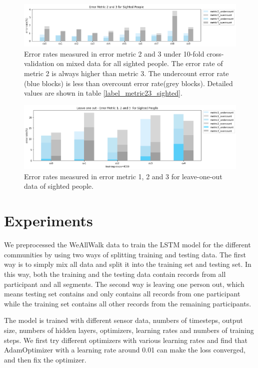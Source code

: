 \documentclass[11pt]{article}
\begin{document}
\begin{figure}[ht]
\centering
\includegraphics[scale=0.5]{error_metric_23_na_10fold}
\caption{Error rates measured in error metric 2 and 3 under 10-fold cross-validation on mixed data for all sighted people. The error rate of metric 2 is always higher than metric 3. The undercount error rate (blue blocks) is less than overcount error rate(grey blocks). Detailed values are shown in table \ref{label_metric23_sighted}.}
\label{fig:error_metric_23_na_10fold}
\end{figure}

\begin{figure}[ht]
\centering
\includegraphics[scale=0.5]{error_metric_123_na_5fold}
\caption{Error rates measured in error metric 1, 2 and 3 for leave-one-out data of sighted people.}
\label{fig:error_metric_123_na_5fold}
\end{figure}


\section{Experiments}

We preprocessed the WeAllWalk data to train the LSTM model for the different communities by using two ways of splitting training and testing data. The first way is to simply mix all data and split it into the training set and testing set. In this way, both the training and the testing data contain records from all participant and all segments. The second way is leaving one person out, which means testing set contains and only contains all records from one participant while the training set contains all other records from the remaining participants.

The model is trained with different sensor data, numbers of timesteps, output size, numbers of hidden layers, optimizers, learning rates and numbers of training steps. We first try different optimizers with various learning rates and find that AdamOptimizer with a learning rate around 0.01 can make the loss converged, and then fix the optimizer. 
\end{document}
